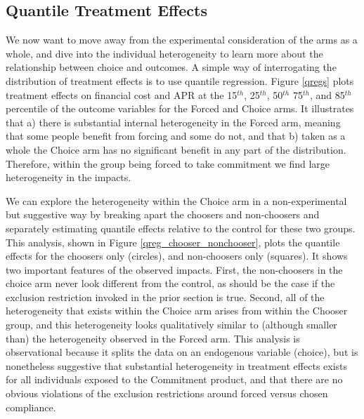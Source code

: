 \documentclass[oneside,11pt]{article}
\begin{document}
\subsection{Quantile Treatment Effects}

We now want to move away from the experimental consideration of the arms as a whole, and dive into the individual heterogeneity to learn more about the relationship between choice and outcomes.  A simple way of interrogating the distribution of treatment effects is to use quantile regression. Figure \ref{qregs} plots treatment effects on financial cost and APR at the 15$^{th}$, 25$^{th}$, 50$^{th}$ 75$^{th}$, and 85$^{th}$ percentile of the outcome variables for the Forced and Choice arms.  It illustrates that a) there is substantial internal heterogeneity in the Forced arm, meaning that some people benefit from forcing and some do not, and that b) taken as a whole the Choice arm has no significant benefit in any part of the distribution.  Therefore, within the group being forced to take commitment we find large heterogeneity in the impacts.  

We can explore the heterogeneity within the Choice arm in a non-experimental but suggestive way by breaking apart the choosers and non-choosers and separately estimating quantile effects relative to the control for these two groups.  This analysis, shown in Figure \ref{qreg_chooser_nonchooser}, plots the quantile effects for the choosers only (circles), and non-choosers only (squares).  It shows two important features of the observed impacts.  First, the non-choosers in the choice arm never look different from the control, as should be the case if the exclusion restriction invoked in the prior section is true.  Second, all of the heterogeneity that exists within the Choice arm arises from within the Chooser group, and this heterogeneity looks qualitatively similar to (although smaller than) the heterogeneity observed in the Forced arm.  This analysis is observational because it splits the data on an endogenous variable (choice), but is nonetheless suggestive that substantial heterogeneity in treatment effects exists for all individuals exposed to the Commitment product, and that there are no obvious violations of the exclusion restrictions around forced versus chosen compliance.




\end{document}
